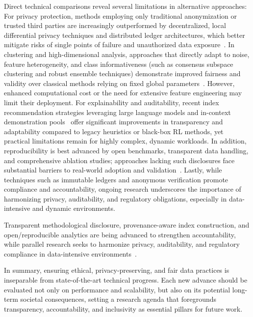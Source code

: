 \documentclass[sigconf]{acmart}
\begin{document}
Direct technical comparisons reveal several limitations in alternative approaches: For privacy protection, methods employing only traditional anonymization or trusted third parties are increasingly outperformed by decentralized, local differential privacy techniques and distributed ledger architectures, which better mitigate risks of single points of failure and unauthorized data exposure~\cite{ref17,ref20}. In clustering and high-dimensional analysis, approaches that directly adapt to noise, feature heterogeneity, and class informativeness (such as consensus subspace clustering and robust ensemble techniques) demonstrate improved fairness and validity over classical methods relying on fixed global parameters~\cite{ref16,ref116,ref117,ref97}. However, enhanced computational cost or the need for extensive feature engineering may limit their deployment. For explainability and auditability, recent index recommendation strategies leveraging large language models and in-context demonstration pools~\cite{ref34} offer significant improvements in transparency and adaptability compared to legacy heuristics or black-box RL methods, yet practical limitations remain for highly complex, dynamic workloads. In addition, reproducibility is best advanced by open benchmarks, transparent data handling, and comprehensive ablation studies; approaches lacking such disclosures face substantial barriers to real-world adoption and validation~\cite{ref34,ref31}. Lastly, while techniques such as immutable ledgers and anonymous verification promote compliance and accountability, ongoing research underscores the importance of harmonizing privacy, auditability, and regulatory obligations, especially in data-intensive and dynamic environments.

Transparent methodological disclosure, provenance-aware index construction, and open/reproducible analytics are being advanced to strengthen accountability, while parallel research seeks to harmonize privacy, auditability, and regulatory compliance in data-intensive environments~\cite{ref17,ref31,ref57,ref75,ref76,ref77,ref78,ref92,ref93,ref96,ref97,ref98,ref99,ref110,ref116,ref117,ref118}.

In summary, ensuring ethical, privacy-preserving, and fair data practices is inseparable from state-of-the-art technical progress. Each new advance should be evaluated not only on performance and scalability, but also on its potential long-term societal consequences, setting a research agenda that foregrounds transparency, accountability, and inclusivity as essential pillars for future work.
\end{document}

